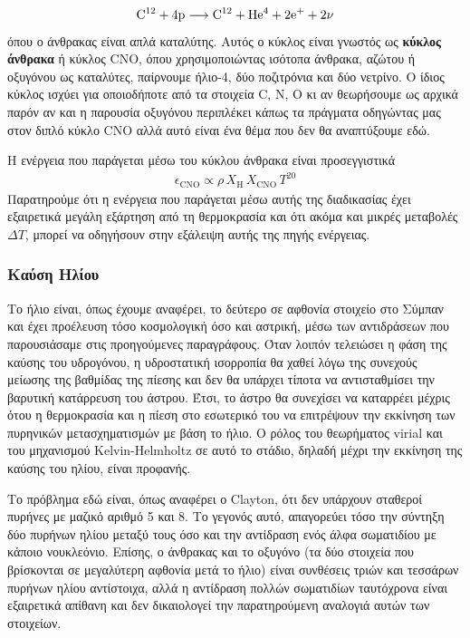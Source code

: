 \begin{eqnarray}
\rm C^{12} + 4p \longrightarrow \rm C^{12} + He^4 + 2e^{+} + 2 \nu \label{eq:c12+4p_c12+he4+2e+2nu}
\end{eqnarray}
όπου ο άνθρακας είναι απλά καταλύτης. Αυτός ο κύκλος είναι γνωστός ως \textbf{κύκλος άνθρακα} ή κύκλος CNO, όπου χρησιμοποιώντας ισότοπα άνθρακα, αζώτου ή οξυγόνου ως καταλύτες, παίρνουμε ήλιο-4, δύο ποζιτρόνια και δύο νετρίνο. Ο ίδιος κύκλος ισχύει για οποιοδήποτε από τα στοιχεία C, N, O κι αν θεωρήσουμε ως αρχικά παρόν αν και η παρουσία οξυγόνου περιπλέκει κάπως τα πράγματα οδηγώντας μας στον διπλό κύκλο CNO αλλά αυτό είναι ένα θέμα που δεν θα αναπτύξουμε εδώ.

Η ενέργεια που παράγεται μέσω του κύκλου άνθρακα είναι προσεγγιστικά
\begin{eqnarray}
    \label{eq:cno_energy}
    \epsilon_{\text{CNO}} \propto \rho \,X_{\text{H}} \,X_{\text{CNO}} \,T^{20} 
\end{eqnarray}
Παρατηρούμε ότι η ενέργεια που παράγεται μέσω αυτής της διαδικασίας έχει εξαιρετικά μεγάλη εξάρτηση από τη θερμοκρασία και ότι ακόμα και μικρές μεταβολές $\Delta T$, μπορεί να οδηγήσουν στην εξάλειψη αυτής της πηγής ενέργειας.
\subsubsection{Καύση Ηλίου}
Το ήλιο είναι, όπως έχουμε αναφέρει, το δεύτερο σε αφθονία στοιχείο στο Σύμπαν και έχει προέλευση τόσο κοσμολογική όσο και αστρική, μέσω των αντιδράσεων που παρουσιάσαμε στις προηγούμενες παραγράφους. Όταν λοιπόν τελειώσει η φάση της καύσης του υδρογόνου, η υδροστατική ισορροπία θα χαθεί λόγω της συνεχούς μείωσης της βαθμίδας της πίεσης και δεν θα υπάρχει τίποτα να αντισταθμίσει την βαρυτική κατάρρευση του άστρου. Έτσι, το άστρο θα συνεχίσει να καταρρέει μέχρις ότου η θερμοκρασία και η πίεση στο εσωτερικό του να επιτρέψουν την εκκίνηση των πυρηνικών μετασχηματισμών με βάση το ήλιο. Ο ρόλος του θεωρήματος virial και του μηχανισμού Kelvin-Helmholtz σε αυτό το στάδιο, δηλαδή μέχρι την εκκίνηση της καύσης του ηλίου, είναι προφανής.

Το πρόβλημα εδώ είναι, όπως αναφέρει ο Clayton, ότι δεν υπάρχουν σταθεροί πυρήνες με μαζικό αριθμό 5 και 8. Το γεγονός αυτό, απαγορεύει τόσο την σύντηξη δύο πυρήνων ηλίου μεταξύ τους όσο και την αντίδραση ενός άλφα σωματιδίου με κάποιο νουκλεόνιο. Επίσης, ο άνθρακας και το οξυγόνο (τα δύο στοιχεία που βρίσκονται σε μεγαλύτερη αφθονία μετά το ήλιο) είναι συνθέσεις τριών και τεσσάρων πυρήνων ηλίου αντίστοιχα, αλλά η αντίδραση πολλών σωματιδίων ταυτόχρονα είναι εξαιρετικά απίθανη και δεν δικαιολογεί την παρατηρούμενη αναλογιά αυτών των στοιχείων.

